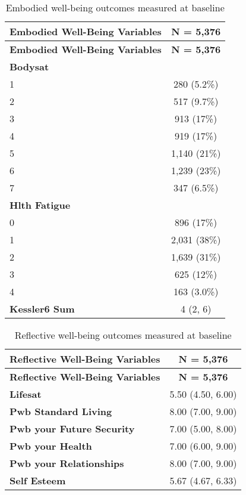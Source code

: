 \documentclass[
  singlecolumn,
  9pt]{article}
\begin{document}
\hypertarget{tbl-table_embody_vars_cats}{}
\begin{longtable}[]{@{}lc@{}}
\caption{\label{tbl-table_embody_vars_cats}Embodied well-being outcomes
measured at baseline}\tabularnewline
\toprule\noalign{}
\textbf{Embodied Well-Being Variables} & \textbf{N = 5,376} \\
\midrule\noalign{}
\endfirsthead
\toprule\noalign{}
\textbf{Embodied Well-Being Variables} & \textbf{N = 5,376} \\
\midrule\noalign{}
\endhead
\bottomrule\noalign{}
\endlastfoot
\textbf{Bodysat} & \\
1 & 280 (5.2\%) \\
2 & 517 (9.7\%) \\
3 & 913 (17\%) \\
4 & 919 (17\%) \\
5 & 1,140 (21\%) \\
6 & 1,239 (23\%) \\
7 & 347 (6.5\%) \\
\textbf{Hlth Fatigue} & \\
0 & 896 (17\%) \\
1 & 2,031 (38\%) \\
2 & 1,639 (31\%) \\
3 & 625 (12\%) \\
4 & 163 (3.0\%) \\
\textbf{Kessler6 Sum} & 4 (2, 6) \\
\end{longtable}

\hypertarget{tbl-table_reflective_vars_cats}{}
\begin{longtable}[]{@{}lc@{}}
\caption{\label{tbl-table_reflective_vars_cats}Reflective well-being
outcomes measured at baseline}\tabularnewline
\toprule\noalign{}
\textbf{Reflective Well-Being Variables} & \textbf{N = 5,376} \\
\midrule\noalign{}
\endfirsthead
\toprule\noalign{}
\textbf{Reflective Well-Being Variables} & \textbf{N = 5,376} \\
\midrule\noalign{}
\endhead
\bottomrule\noalign{}
\endlastfoot
\textbf{Lifesat} & 5.50 (4.50, 6.00) \\
\textbf{Pwb Standard Living} & 8.00 (7.00, 9.00) \\
\textbf{Pwb your Future Security} & 7.00 (5.00, 8.00) \\
\textbf{Pwb your Health} & 7.00 (6.00, 9.00) \\
\textbf{Pwb your Relationships} & 8.00 (7.00, 9.00) \\
\textbf{Self Esteem} & 5.67 (4.67, 6.33) \\
\end{longtable}
\end{document}
